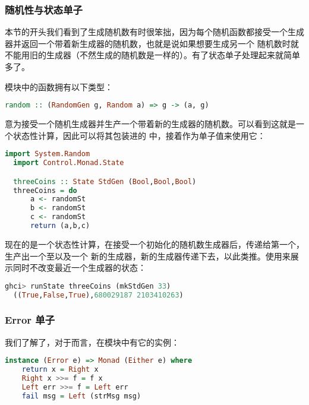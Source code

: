 \documentclass[./main.tex]{subfiles}
\begin{document}
\subsubsection*{随机性与状态单子}

本节的开头我们看到了生成随机数有时很笨拙，因为每个随机函数都接受一个生成器并返回一个带着新生成器的随机数，也就是说如果想要生成另一个
随机数时就不能用旧的生成器（不然生成的随机数是一样的）。有了状态单子处理起来就简单多了。

模块中的函数拥有以下类型：

\begin{lstlisting}[language=Haskell]
  random :: (RandomGen g, Random a) => g -> (a, g)
\end{lstlisting}

意为接受一个随机生成器并生产一个带着新的生成器的随机数。可以看到这就是一个状态性计算，因此可以将其包装进的
中，接着作为单子值来使用它：

\begin{lstlisting}[language=Haskell]
  import System.Random
  import Control.Monad.State

  threeCoins :: State StdGen (Bool,Bool,Bool)
  threeCoins = do
      a <- randomSt
      b <- randomSt
      c <- randomSt
      return (a,b,c)
\end{lstlisting}

现在的是一个状态性计算，在接受一个初始化的随机数生成器后，传递给第一个，生产出一个至以及一个
新的生成器，新的生成器传递下去，以此类推。使用来展示同时不改变最近一个生成器的状态：

\begin{lstlisting}[language=Haskell]
  ghci> runState threeCoins (mkStdGen 33)
  ((True,False,True),680029187 2103410263)
\end{lstlisting}

\subsubsection*{Error 单子}

我们了解了，对于而言，在模块中有它的实例：

\begin{lstlisting}[language=Haskell]
  instance (Error e) => Monad (Either e) where
    return x = Right x
    Right x >>= f = f x
    Left err >>= f = Left err
    fail msg = Left (strMsg msg)
\end{lstlisting}
\end{document}
